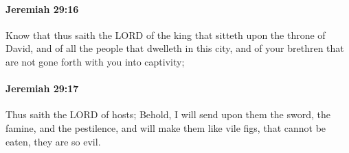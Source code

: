 		\paragraph{Jeremiah 29:16} %
			\label{JEREMIAH-29-16}

			Know that thus saith the LORD of the king that sitteth upon the throne of David, and of all the people that dwelleth in this city, and of your brethren that are not gone forth with you into captivity;


		\paragraph{Jeremiah 29:17} %
			\label{JEREMIAH-29-17}

			Thus saith the LORD of hosts; Behold, I will send upon them the sword, the famine, and the pestilence, and will make them like vile figs, that cannot be eaten, they are so evil.

